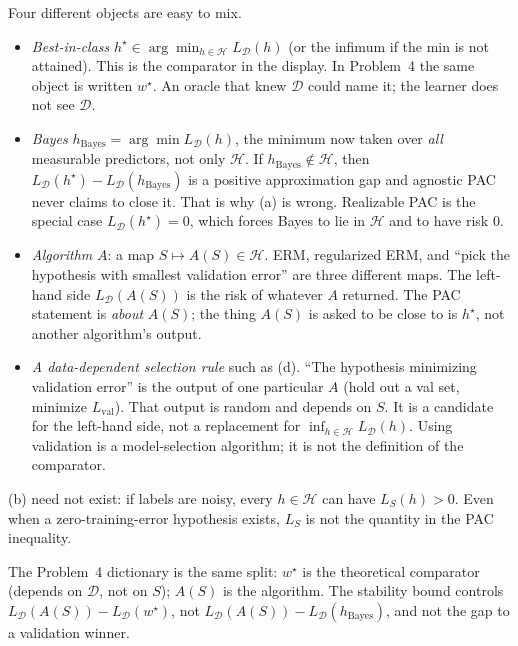 \begin{solution}
Four different objects are easy to mix.
\begin{itemize}
    \item \textit{Best-in-class} $h^\star\in\arg\min_{h\in\mathcal{H}}L_{\mathcal{D}}(h)$ (or the infimum if the min is not attained). This is the comparator in the display. In Problem~4 the same object is written $w^\star$. An oracle that knew $\mathcal{D}$ could name it; the learner does not see $\mathcal{D}$.
    \item \textit{Bayes} $h_{\mathrm{Bayes}}=\arg\min L_{\mathcal{D}}(h)$, the minimum now taken over \emph{all} measurable predictors, not only $\mathcal{H}$. If $h_{\mathrm{Bayes}}\notin\mathcal{H}$, then $L_{\mathcal{D}}(h^\star)-L_{\mathcal{D}}(h_{\mathrm{Bayes}})$ is a positive approximation gap and agnostic PAC never claims to close it. That is why (a) is wrong. Realizable PAC is the special case $L_{\mathcal{D}}(h^\star)=0$, which forces Bayes to lie in $\mathcal{H}$ and to have risk $0$.
    \item \textit{Algorithm} $A$: a map $S\mapsto A(S)\in\mathcal{H}$. ERM, regularized ERM, and ``pick the hypothesis with smallest validation error'' are three different maps. The left-hand side $L_{\mathcal{D}}(A(S))$ is the risk of whatever $A$ returned. The PAC statement is \emph{about} $A(S)$; the thing $A(S)$ is asked to be close to is $h^\star$, not another algorithm's output.
    \item \textit{A data-dependent selection rule} such as (d). ``The hypothesis minimizing validation error'' is the output of one particular $A$ (hold out a val set, minimize $L_{\mathrm{val}}$). That output is random and depends on $S$. It is a candidate for the left-hand side, not a replacement for $\inf_{h\in\mathcal{H}}L_{\mathcal{D}}(h)$. Using validation is a model-selection algorithm; it is not the definition of the comparator.
\end{itemize}
(b) need not exist: if labels are noisy, every $h\in\mathcal{H}$ can have $L_S(h)>0$. Even when a zero-training-error hypothesis exists, $L_S$ is not the quantity in the PAC inequality.

The Problem~4 dictionary is the same split: $w^\star$ is the theoretical comparator (depends on $\mathcal{D}$, not on $S$); $A(S)$ is the algorithm. The stability bound controls $L_{\mathcal{D}}(A(S))-L_{\mathcal{D}}(w^\star)$, not $L_{\mathcal{D}}(A(S))-L_{\mathcal{D}}(h_{\mathrm{Bayes}})$, and not the gap to a validation winner.
\end{solution}

